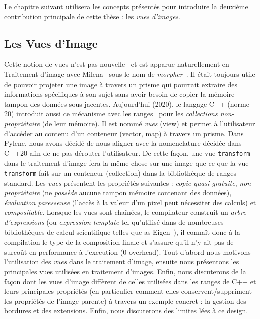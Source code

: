 Le chapitre suivant utilisera les concepts présentés pour introduire la deuxième contribution principale de cette thèse
: les \emph{vues d'images}.


\subsection*{Les Vues d'Image}


Cette notion de vues n'est pas nouvelle~\parencite{novak.1997.reuse} et est apparue naturellement en Traitement d'image
avec Milena~\parencite{geraud.2012.ipolmeeting,levillain.2010.icip} sous le nom de
\emph{morpher}~\parencite{levillain.2009.ismm, geraud.2012.hdr}. Il était toujours utile de pouvoir projeter une image à
travers un prisme qui pourrait extraire des informations spécifiques à son sujet sans avoir besoin de copier la mémoire
tampon des données sous-jacentes. Aujourd'hui (2020), le langage C++ (norme 20) introduit aussi ce mécanisme avec les
ranges~\parencite{niebler.2014.ranges} pour les \emph{collections non-propriétaire} (de leur mémoire). Il est nommé
\emph{vues} (view) et permet à l'utilisateur d'accéder au contenu d'un conteneur (vector, map) à travers un prisme. Dans
Pylene, nous avons décidé de nous aligner avec la nomenclature décidée dans C++20 afin de ne pas dérouter l'utilisateur.
De cette façon, une vue \texttt{transform} dans le traitement d'image fera la même chose sur une image que ce que la vue
\texttt{transform} fait sur un conteneur (collection) dans la bibliothèque de ranges standard. Les \emph{vues}
présentent les propriétés suivantes : \emph{copie quasi-gratuite}, \emph{non-propriétaire} (ne \emph{possède} aucune
tampon mémoire contenant des données), \emph{évaluation paresseuse} (l'accès à la valeur d'un pixel peut nécessiter des
calculs) et \emph{compositable}. Lorsque les vues sont chaînées, le compilateur construit un \emph{arbre d'expressions}
(ou \emph{expression template} tel qu'utilisé dans de nombreuses bibliothèques de calcul scientifique telles que as
Eigen~\parencite{guennebaud.2010.eigen}), il connaît donc à la compilation le type de la composition finale et s'assure
qu'il n'y ait pas de surcoût en performance à l'execution (0-overhead). Tout d'abord nous motivons l'utilisation des
\emph{vues} dans le traitement d'image, ensuite nous présentons les principales vues utilisées en traitement d'images.
Enfin, nous discuterons de la façon dont les vues d'image diffèrent de celles utilisées dans les ranges de C++ et leurs
principales propriétés (en particulier comment elles conservent/suppriment les propriétés de l'image parente) à travers
un exemple concret : la gestion des bordures et des extensions. Enfin, nous discuterons des limites lées à ce design.

